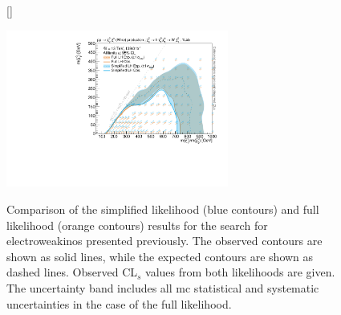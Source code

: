 \begin{figure}[hb]
[\FBwidth]
{\caption{Comparison of the simplified likelihood (blue contours) and full likelihood (orange contours) results for the search for electroweakinos presented previously. The observed contours are shown as solid lines, while the expected contours are shown as dashed lines. Observed CL$_s$ values from both likelihoods are given. The uncertainty band includes all \gls{mc} statistical and systematic uncertainties in the case of the full likelihood.}\label{fig:app_results_simplify_1Lbb}}
{\includegraphics[width=0.65\textwidth]{exclusion_1Lbb_CLs_noLabel}}
\end{figure}



